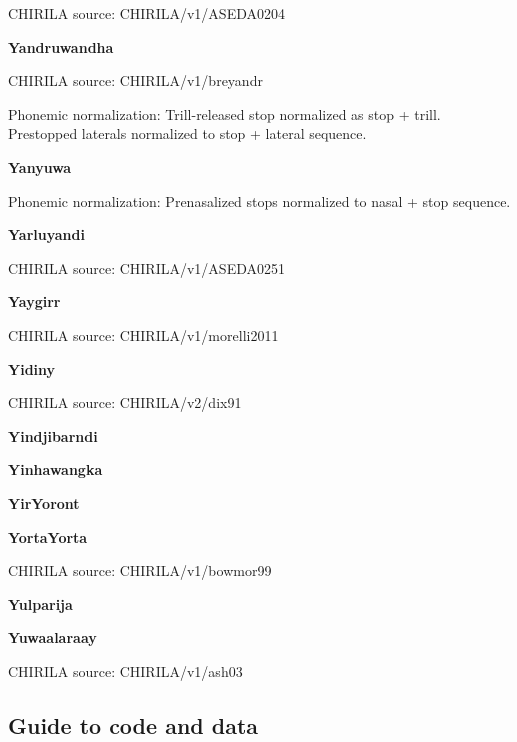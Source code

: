 CHIRILA source: CHIRILA/v1/ASEDA0204


\textbf{Yandruwandha}

CHIRILA source: CHIRILA/v1/breyandr


Phonemic normalization: Trill-released stop normalized as stop + trill.
Prestopped laterals normalized to stop + lateral sequence.

\textbf{Yanyuwa}


Phonemic normalization: Prenasalized stops normalized to nasal + stop
sequence.

\textbf{Yarluyandi}

CHIRILA source: CHIRILA/v1/ASEDA0251


\textbf{Yaygirr}

CHIRILA source: CHIRILA/v1/morelli2011


\textbf{Yidiny}

CHIRILA source: CHIRILA/v2/dix91


\textbf{Yindjibarndi}


\textbf{Yinhawangka}


\textbf{YirYoront}


\textbf{YortaYorta}

CHIRILA source: CHIRILA/v1/bowmor99


\textbf{Yulparija}


\textbf{Yuwaalaraay}

CHIRILA source: CHIRILA/v1/ash03


\newpage

\hypertarget{guide-to-code-and-data}{%
\subsection{Guide to code and
data}\label{guide-to-code-and-data}}

